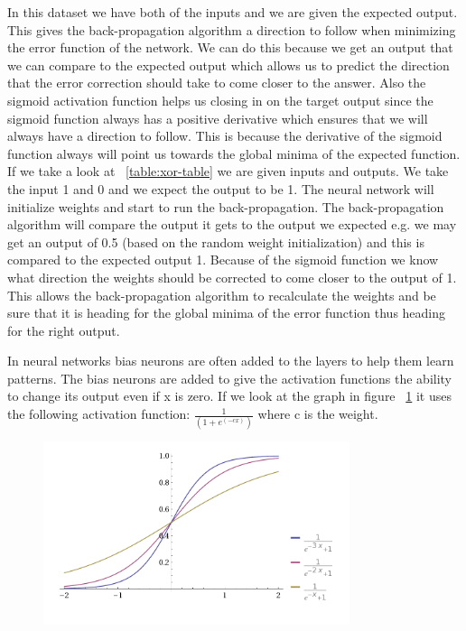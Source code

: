 In this dataset we have both of the inputs and we are given the expected output. This gives the back-propagation algorithm a direction to follow when minimizing the error function of the network. We can do this because we get an output that we can compare to the expected output which allows us to predict the direction that the error correction should take to come closer to the answer. Also the sigmoid activation function helps us closing in on the target output since the sigmoid function always has a positive derivative which ensures that we will always have a direction to follow\cite[p. 153]{rojas1996neural}. This is because the derivative of the sigmoid function always will point us towards the global minima of the expected function. If we take a look at ~\ref{table:xor-table} we are given inputs and outputs. We take the input 1 and 0 and we expect the output to be 1. The neural network will initialize weights and start to run the back-propagation. The back-propagation algorithm will compare the output it gets to the output we expected e.g. we may get an output of 0.5 (based on the random weight initialization) and this is compared to the expected output 1. Because of the sigmoid function we know what direction the weights should be corrected to come closer to the output of 1. This allows the back-propagation algorithm to recalculate the weights and be sure that it is heading for the global minima of the error function thus heading for the right output.

In neural networks bias neurons are often added to the layers to help them learn patterns. The bias neurons are added to give the activation functions the ability to change its output even if x is zero. If we look at the graph in figure ~\ref{fig:activationFunctions} it uses the following activation function: \begin{math} \frac{1}{(1+e^{(-cx)})} \end{math} where c is the weight.

\begin{figure}[h!]
\centering
\includegraphics[width=0.8\textwidth ,natwidth=410,natheight=237]{billeder/ActivationFunctions.png}
\caption{}
\label{fig:activationFunctions}
\end{figure}

